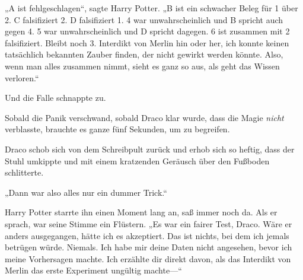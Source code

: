 „A ist fehlgeschlagen“, sagte Harry Potter. „B ist ein schwacher Beleg für 1 über 2. C falsifiziert 2. D falsifiziert 1. 4 war unwahrscheinlich und B spricht auch gegen 4. 5 war unwahrscheinlich und D spricht dagegen. 6 ist zusammen mit 2 falsifiziert. Bleibt noch 3. Interdikt von Merlin hin oder her, ich konnte keinen tatsächlich bekannten Zauber finden, der nicht gewirkt werden könnte. Also, wenn man alles zusammen nimmt, sieht es ganz so aus, als geht das Wissen verloren.“

Und die Falle schnappte zu.

Sobald die Panik verschwand, sobald Draco klar wurde, dass die Magie \emph{nicht} verblasste, brauchte es ganze fünf Sekunden, um zu begreifen.

Draco schob sich von dem Schreibpult zurück und erhob sich so heftig, dass der Stuhl umkippte und mit einem kratzenden Geräusch über den Fußboden schlitterte.

„Dann war also alles nur ein dummer Trick.“

Harry Potter starrte ihn einen Moment lang an, saß immer noch da. Als er sprach, war seine Stimme ein Flüstern. „Es war ein fairer Test, Draco. Wäre er anders ausgegangen, hätte ich es akzeptiert. Das ist nichts, bei dem ich jemals betrügen würde. Niemals. Ich habe mir deine Daten nicht angesehen, bevor ich meine Vorhersagen machte. Ich erzählte dir direkt davon, als das Interdikt von Merlin das erste Experiment ungültig machte—“

